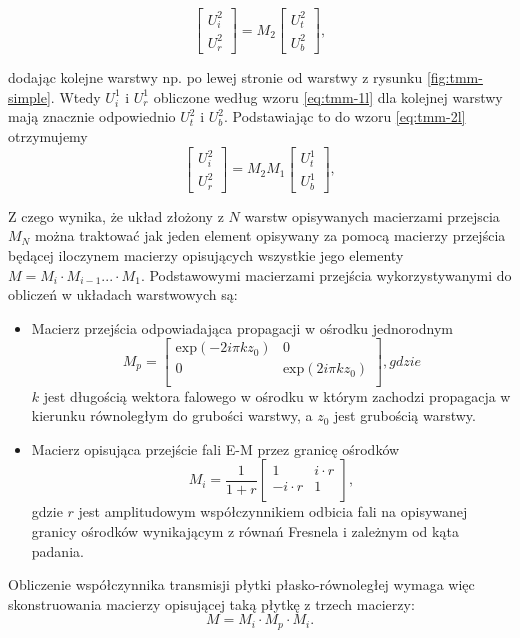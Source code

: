 \begin{equation}
	\begin{bmatrix}
	U_i^2 \\ 
	U_r^2
	\end{bmatrix}
	= M_2 
	\begin{bmatrix}
	U_t^2 \\
	U_b^2
	\end{bmatrix},
\label{eq:tmm-2l}
\end{equation}

dodając kolejne warstwy np. po lewej stronie od warstwy z rysunku \ref{fig:tmm-simple}. Wtedy $U_i^1$ i $U_r^1$ obliczone według wzoru \ref{eq:tmm-1l} dla kolejnej warstwy mają znacznie odpowiednio $U_t^2$ i $U_b^2$. Podstawiając to do wzoru \ref{eq:tmm-2l} otrzymujemy 
\begin{equation}
\begin{bmatrix}
U_i^2 \\ 
U_r^2
\end{bmatrix}
=M_2 M_1 
\begin{bmatrix}
U_t^1 \\
U_b^1
\end{bmatrix},
\label{eq:tmm-2ls}
\end{equation}

Z czego wynika, że układ złożony z $N$ warstw opisywanych macierzami przejscia $M_N$ można traktować jak jeden element opisywany za pomocą macierzy przejścia będącej iloczynem macierzy opisujących wszystkie jego elementy $M= M_i \cdot M_{i-1} ... \cdot M_1$. Podstawowymi macierzami przejścia wykorzystywanymi do obliczeń w układach warstwowych są:
\begin{itemize}
\item Macierz przejścia odpowiadająca propagacji w ośrodku jednorodnym 
\begin{equation}
	M_p=
	\begin{bmatrix}
	\textrm{exp}(-2i\pi k z_0) & 0 \\
	0	&\textrm{exp}(2i\pi k z_0)\\
	\end{bmatrix},gdzie
\end{equation}
$k$ jest długością wektora falowego w ośrodku w którym zachodzi propagacja w kierunku równoległym do grubości warstwy, a $z_0$ jest grubością warstwy.
\item Macierz opisująca przejście fali E-M przez granicę ośrodków
\begin{equation}
	M_i=\frac{1}{1+r}
	\begin{bmatrix}
	1 & i \cdot r \\
	-i \cdot r & 1\\
	\end{bmatrix},
\end{equation}
gdzie $r$ jest amplitudowym współczynnikiem odbicia fali na opisywanej granicy ośrodków wynikającym z równań Fresnela i zależnym od kąta padania. 
\end{itemize}

Obliczenie współczynnika transmisji płytki płasko-równoległej wymaga więc skonstruowania macierzy opisującej taką płytkę z trzech macierzy: 
\[
M=M_i \cdot M_p \cdot  M_i.
\]
